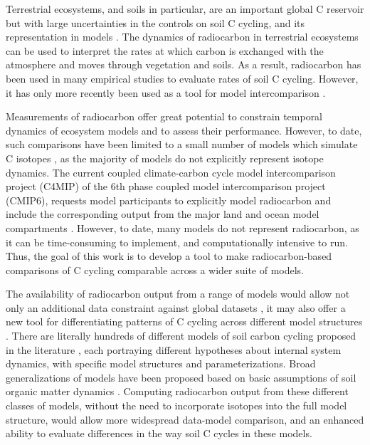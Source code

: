 \documentclass[11pt,a4paper]{article}
\begin{document}
Terrestrial ecosystems, and soils in particular, are an important global C reservoir but with large uncertainties in the controls on soil C cycling, and its representation in models \citep{Luo2016}. The dynamics of radiocarbon in terrestrial ecosystems can be used to interpret the rates at which carbon is exchanged with the atmosphere and moves through vegetation and soils. As a result, radiocarbon has been used in many empirical studies to evaluate rates of soil C cycling. However, it has only more recently been used as a tool for model intercomparison \citep{He2016}. 

Measurements of radiocarbon offer great potential to constrain temporal dynamics of ecosystem models and to assess their performance. However, to date, such comparisons have been limited to a small number of models which simulate C isotopes \citep[e.g.][]{Koven2013, Tifafi2018}, as the majority of models do not explicitly represent isotope dynamics. The current coupled climate-carbon cycle model intercomparison project (C4MIP) of the 6th phase coupled model intercomparison project (CMIP6), requests model participants to explicitly model radiocarbon and include the corresponding output from the major land and ocean model compartments \citep{Jones2016}. However, to date, many models do not represent radiocarbon, as it can be time-consuming to implement, and computationally intensive to run. Thus, the goal of this work is to develop a tool to make radiocarbon-based comparisons of C cycling comparable across a wider suite of models.

The availability of radiocarbon output from a range of models would allow not only an additional data constraint against global datasets \citep{He2016, Mathieu2015}, it may also offer a new tool for differentiating patterns of C cycling across different model structures \citep{Sierra2014}. 
There are literally hundreds of different models of soil carbon cycling proposed in the literature \citep{Manzoni2009SBB}, each portraying different hypotheses about internal system dynamics, with specific model structures and parameterizations. Broad generalizations of models have been proposed based on basic assumptions of soil organic matter dynamics \citep{Sierra2015}.
Computing radiocarbon output from these different classes of models, without the need to incorporate isotopes into the full model structure, would allow more widespread data-model comparison, and an enhanced ability to evaluate differences in the way soil C cycles in these models.
\end{document}
